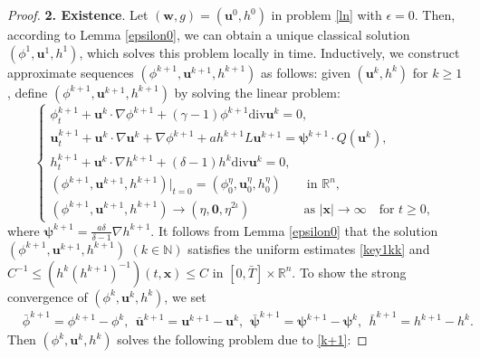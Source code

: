 \documentclass[10pt,a4paper]{amsart}
\begin{document}
\begin{proof}
\smallskip
\textbf{2. Existence}. Let $(\boldsymbol{w},g)=(\boldsymbol{u}^0, h^0)$ in problem  \eqref{ln} with $\epsilon=0$. Then, according to Lemma \ref{epsilon0},
we  can obtain a unique  classical solution $(\phi^1,\boldsymbol{u}^1,h^1)$, which solves this problem locally in time. Inductively, we construct approximate sequences $(\phi^{k+1},\boldsymbol{u}^{k+1},h^{k+1})$ as follows:
given $(\boldsymbol{u}^k, h^k)$ for $k\geq 1$, define  $(\phi^{k+1},\boldsymbol{u}^{k+1},h^{k+1})$ by solving the  linear problem:
\begin{equation}\label{k+1}
\begin{cases}
\displaystyle
\phi^{k+1}_t+\boldsymbol{u}^k\cdot\nabla\phi^{k+1}+(\gamma-1)\phi^{k+1}\mathrm{div}\boldsymbol{u}^k=0,\\[2pt]
\displaystyle
\boldsymbol{u}_t^{k+1}+\boldsymbol{u}^k\cdot\nabla \boldsymbol{u}^k+\nabla\phi^{k+1}+ah^{k+1}L\boldsymbol{u}^{k+1}
=\boldsymbol{\psi}^{k+1}\cdot Q(\boldsymbol{u}^k),\\[2pt]
\displaystyle
h^{k+1}_t+\boldsymbol{u}^k\cdot \nabla h^{k+1}+(\delta-1)h^k\mathrm{div}\boldsymbol{u}^k=0,\\[2pt]
\displaystyle
(\phi^{k+1},\boldsymbol{u}^{k+1},h^{k+1})|_{t=0}=(\phi^\eta_0,\boldsymbol{u}^\eta_0,h^\eta_0)
 \qquad \text{in $\mathbb{R}^n$}, \\[2pt]
\displaystyle
(\phi^{k+1},\boldsymbol{u}^{k+1},h^{k+1})\to (\eta,\boldsymbol{0},\eta^{2\iota}) \quad\quad \ \qquad \text{as $|\boldsymbol{x}|\to \infty$} \quad \text{for $t\geq 0$},
\end{cases}
\end{equation}
where $\boldsymbol{\psi}^{k+1}=\frac{a\delta}{\delta-1}\nabla h^{k+1}$.
It follows from Lemma \ref{epsilon0} that the solution  $(\phi^{k+1},\boldsymbol{u}^{k+1},h^{k+1})$ $(k\in \mathbb{N})$ satisfies  the uniform estimates \eqref{key1kk}  and $C^{-1}\leq (h^k(h^{k+1})^{-1})(t,\boldsymbol{x})\leq C$ in $[0,\bar{T}]\times\mathbb{R}^n$.
To show the strong convergence of $(\phi^k,\boldsymbol{u}^k,h^k)$, we set
\begin{equation*}
\begin{aligned}
&\bar{\phi}^{k+1}=\phi^{k+1}-\phi^k,\ \ \bar{\boldsymbol{u}}^{k+1}=\boldsymbol{u}^{k+1}-\boldsymbol{u}^k, \ \  \bar{\boldsymbol{\psi}}^{k+1}=\boldsymbol{\psi}^{k+1}-\boldsymbol{\psi}^k,\ \  \bar{h}^{k+1}=h^{k+1}-h^k.
\end{aligned}
\end{equation*}
Then $(\phi^k,\boldsymbol{u}^k,h^k)$ solves the following problem due to \eqref{k+1}: 

\end{proof}
\end{document}

